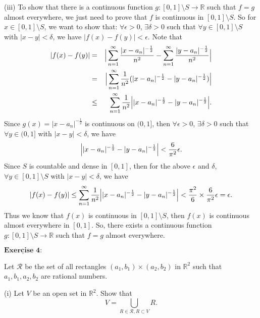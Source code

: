 \documentclass[12pt,a4paper]{ctexart}
\begin{document}
(iii) To show that there is a continuous function $g : [0, 1] \setminus S \rightarrow \mathbb{R}$ such that $f = g$ almost everywhere, we just need to prove that $f$ is continuous in $[0, 1] \setminus S$. So for $x \in [0, 1] \setminus S$, we want to show that: $\forall \epsilon > 0$, $\exists \delta > 0$ such that $\forall y \in [0, 1] \setminus S$ with $|x - y| < \delta$, we have $|f(x) - f(y)| < \epsilon$. Note that
\begin{eqnarray*}
|f(x) - f(y)| & =& \Big{|} \sum_{n = 1}^{\infty} \frac{|x - a_{n}|^{- \frac{1}{2}}}{n^{2}} - \sum_{n = 1}^{\infty} \frac{|y - a_{n}|^{- \frac{1}{2}}}{n^{2}} \Big{|} \\
& = &  \Big{|} \sum_{n = 1}^{\infty} \frac{1}{n^{2}} (|x - a_{n}|^{- \frac{1}{2}} - |y - a_{n}|^{- \frac{1}{2}}) \Big{|} \\
& \leq & \sum_{n = 1}^{\infty} \frac{1}{n^{2}}  \Big{|} |x - a_{n}|^{- \frac{1}{2}} - |y - a_{n}|^{- \frac{1}{2}} \Big{|}.
\end{eqnarray*}
Since $g(x) = |x - a_{n}|^{- \frac{1}{2}}$ is continuous on $(0, 1]$, then $\forall \epsilon > 0$, $\exists \delta > 0$ such that $\forall y \in (0, 1]$ with $|x - y| < \delta$, we have 
\begin{equation*}
   \Big{|} |x - a_{n}|^{- \frac{1}{2}} - |y - a_{n}|^{- \frac{1}{2}} \Big{|} < \frac{6}{\pi^{2}} \epsilon.
\end{equation*}
Since $S$ is countable and dense in $[0, 1]$, then for the above $\epsilon$ and $\delta$, $\forall y \in [0, 1] \setminus S$ with $|x - y| < \delta$, we have
\begin{equation*}
   |f(x) - f(y)| \leq \sum_{n = 1}^{\infty} \frac{1}{n^{2}}  \Big{|} |x - a_{n}|^{- \frac{1}{2}} - |y - a_{n}|^{- \frac{1}{2}} \Big{|} < \frac{\pi^{2}}{6} \times \frac{6}{\pi^{2}} \epsilon = \epsilon.
\end{equation*}
Thus we know that $f(x)$ is continuous in $[0, 1] \setminus S$, then $f(x)$ is continuous almost everywhere in $[0, 1]$. So, there exists a continuous function $g : [0, 1] \setminus S \rightarrow \mathbb{R}$ such that $f = g$ almost everywhere.


\newpage

$\underline{\textbf{Exercise 4:}}$

Let $\mathcal{R}$ be the set of all rectangles $(a_{1}, b_{1}) \times (a_{2}, b_{2})$ in $\mathbb{R}^{2}$ such that $a_{1}, b_{1}, a_{2}, b_{2}$ are rational numbers.

(i) Let $V$ be an open set in $\mathbb{R}^{2}$. Show that 
\begin{equation*}
   V = \bigcup_{R \in \mathcal{R}, R \subset V} R.
\end{equation*}
\end{document}
